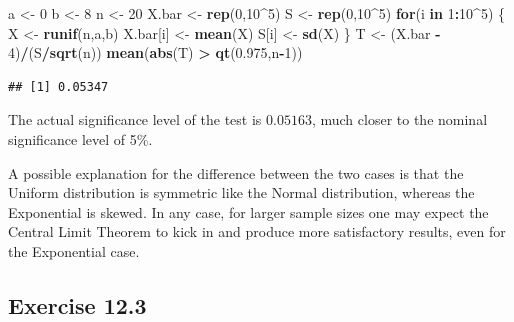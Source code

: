 \documentclass[]{krantz}
\makeatletter
\newenvironment{Shaded}{\begin{snugshade}}{\end{snugshade}}
\newcommand{\KeywordTok}[1]{\textcolor[rgb]{0.13,0.29,0.53}{\textbf{#1}}}
\newcommand{\DecValTok}[1]{\textcolor[rgb]{0.00,0.00,0.81}{#1}}
\newcommand{\FloatTok}[1]{\textcolor[rgb]{0.00,0.00,0.81}{#1}}
\newcommand{\StringTok}[1]{\textcolor[rgb]{0.31,0.60,0.02}{#1}}
\newcommand{\ControlFlowTok}[1]{\textcolor[rgb]{0.13,0.29,0.53}{\textbf{#1}}}
\newcommand{\OperatorTok}[1]{\textcolor[rgb]{0.81,0.36,0.00}{\textbf{#1}}}
\newcommand{\NormalTok}[1]{#1}
\newenvironment{kframe}{%
\medskip{}
\setlength{\fboxsep}{.8em}
 \def\at@end@of@kframe{}%
 \ifinner\ifhmode%
  \def\at@end@of@kframe{\end{minipage}}%
  \begin{minipage}{\columnwidth}%
 \fi\fi%
 \def\FrameCommand##1{\hskip\@totalleftmargin \hskip-\fboxsep
 \colorbox{shadecolor}{##1}\hskip-\fboxsep
     \hskip-\linewidth \hskip-\@totalleftmargin \hskip\columnwidth}%
 \MakeFramed {\advance\hsize-\width
   \@totalleftmargin\z@ \linewidth\hsize
   \@setminipage}}%
 {\par\unskip\endMakeFramed%
 \at@end@of@kframe}
\renewenvironment{Shaded}{\begin{kframe}}{\end{kframe}}
\theoremstyle{definition}
\theoremstyle{definition}
\theoremstyle{definition}
\theoremstyle{remark}
\makeatother
\begin{document}
\begin{enumerate}
\begin{Shaded}
\begin{Highlighting}[]
\NormalTok{a <-}\StringTok{ }\DecValTok{0}
\NormalTok{b <-}\StringTok{ }\DecValTok{8}
\NormalTok{n <-}\StringTok{ }\DecValTok{20}
\NormalTok{X.bar <-}\StringTok{ }\KeywordTok{rep}\NormalTok{(}\DecValTok{0}\NormalTok{,}\DecValTok{10}\OperatorTok{^}\DecValTok{5}\NormalTok{)}
\NormalTok{S <-}\StringTok{ }\KeywordTok{rep}\NormalTok{(}\DecValTok{0}\NormalTok{,}\DecValTok{10}\OperatorTok{^}\DecValTok{5}\NormalTok{)}
\ControlFlowTok{for}\NormalTok{(i }\ControlFlowTok{in} \DecValTok{1}\OperatorTok{:}\DecValTok{10}\OperatorTok{^}\DecValTok{5}\NormalTok{) \{}
\NormalTok{  X <-}\StringTok{ }\KeywordTok{runif}\NormalTok{(n,a,b)}
\NormalTok{  X.bar[i] <-}\StringTok{ }\KeywordTok{mean}\NormalTok{(X)}
\NormalTok{  S[i] <-}\StringTok{ }\KeywordTok{sd}\NormalTok{(X)}
\NormalTok{\}}
\NormalTok{T <-}\StringTok{ }\NormalTok{(X.bar }\OperatorTok{-}\StringTok{ }\DecValTok{4}\NormalTok{)}\OperatorTok{/}\NormalTok{(S}\OperatorTok{/}\KeywordTok{sqrt}\NormalTok{(n))}
\KeywordTok{mean}\NormalTok{(}\KeywordTok{abs}\NormalTok{(T) }\OperatorTok{>}\StringTok{ }\KeywordTok{qt}\NormalTok{(}\FloatTok{0.975}\NormalTok{,n}\OperatorTok{-}\DecValTok{1}\NormalTok{))}
\end{Highlighting}
\end{Shaded}

\begin{verbatim}
## [1] 0.05347
\end{verbatim}

  The actual significance level of the test is \(0.05163\), much closer
  to the nominal significance level of 5\%.

  A possible explanation for the difference between the two cases is
  that the Uniform distribution is symmetric like the Normal
  distribution, whereas the Exponential is skewed. In any case, for
  larger sample sizes one may expect the Central Limit Theorem to kick
  in and produce more satisfactory results, even for the Exponential
  case.
\end{enumerate}

\subsection*{Exercise 12.3}\label{exercise-12.3}
\end{document}
